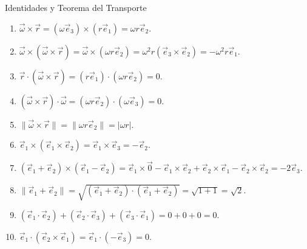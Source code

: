 \begin{solucion}{Identidades y Teorema del Transporte}
\begin{enumerate}
    \item $\vec{\omega} \times \vec{r} = (\omega\vec{e}_3) \times (r\vec{e}_1) = \omega r \vec{e}_2$.
    \item $\vec{\omega} \times (\vec{\omega} \times \vec{r}) = \vec{\omega} \times (\omega r \vec{e}_2) = \omega^2 r (\vec{e}_3 \times \vec{e}_2) = -\omega^2 r \vec{e}_1$.
    \item $\vec{r} \cdot (\vec{\omega} \times \vec{r}) = (r\vec{e}_1) \cdot (\omega r \vec{e}_2) = 0$.
    \item $(\vec{\omega} \times \vec{r}) \cdot \vec{\omega} = (\omega r \vec{e}_2) \cdot (\omega\vec{e}_3) = 0$.
    \item $\| \vec{\omega} \times \vec{r} \| = \| \omega r \vec{e}_2 \| = |\omega r|$.
    \item $\vec{e}_1 \times (\vec{e}_1 \times \vec{e}_2) = \vec{e}_1 \times \vec{e}_3 = -\vec{e}_2$.
    \item $(\vec{e}_1 + \vec{e}_2) \times (\vec{e}_1 - \vec{e}_2) = \vec{e}_1 \times \vec{0} - \vec{e}_1 \times \vec{e}_2 + \vec{e}_2 \times \vec{e}_1 - \vec{e}_2 \times \vec{e}_2 = -2\vec{e}_3$.
    \item $\| \vec{e}_1 + \vec{e}_2 \| = \sqrt{(\vec{e}_1 + \vec{e}_2) \cdot (\vec{e}_1 + \vec{e}_2)} = \sqrt{1 + 1} = \sqrt{2}$.
    \item $(\vec{e}_1 \cdot \vec{e}_2) + (\vec{e}_2 \cdot \vec{e}_3) + (\vec{e}_3 \cdot \vec{e}_1) = 0 + 0 + 0 = 0$.
    \item $\vec{e}_1 \cdot (\vec{e}_2 \times \vec{e}_1) = \vec{e}_1 \cdot (-\vec{e}_3) = 0$.
\end{enumerate}
\end{solucion}
